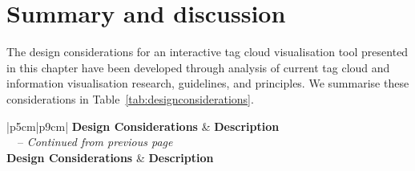 \section{Summary and discussion}

The design considerations for an interactive tag cloud visualisation tool presented in this chapter have been developed through analysis of current tag cloud and information visualisation research, guidelines, and principles. We summarise these considerations in Table~\ref{tab:designconsiderations}.

\begin{longtable}{|p{5cm}|p{9cm}|} 
\hline
\textbf{Design Considerations} & \textbf{Description} \\
\hline
\endfirsthead
{}%
{\tablename\ \thetable\ -- \textit{Continued from previous page}} \\
\hline
\textbf{Design Considerations} & \textbf{Description} \\
\hline
\endhead


\end{longtable}
